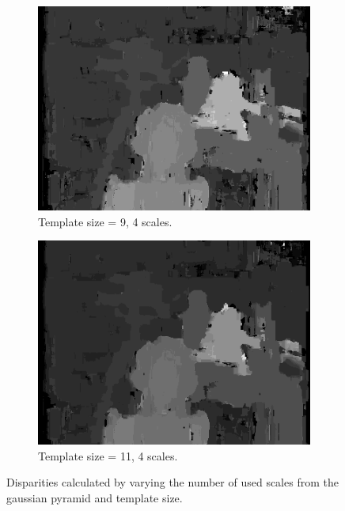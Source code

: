\documentclass[12pt,a4paper,oneside,final]{article}
\begin{document}
\begin{figure}[H]
\begin{subfigure}[b]{0.24\textwidth}
	\includegraphics[width=\textwidth]{disparity_s4_k9.png}
	\caption{Template size = 9, 4 scales.}
\end{subfigure}
\begin{subfigure}[b]{0.24\textwidth}
	\includegraphics[width=\textwidth]{disparity_s4_k11.png}
	\caption{Template size = 11, 4 scales.}
\end{subfigure}
\caption{Disparities calculated by varying the number of used scales from the gaussian pyramid and template size.}
\label{fig:disparities}
\end{figure}
\end{document}
